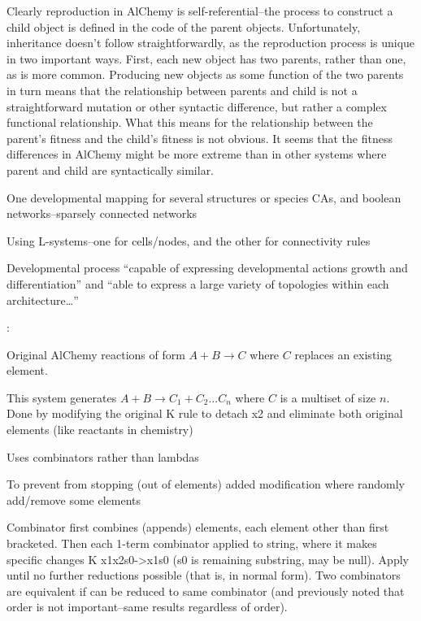 Clearly reproduction in AlChemy is self-referential--the process to construct a child object is defined in the code of the parent objects. Unfortunately, inheritance doesn't follow straightforwardly, as the reproduction process is unique in two important ways. First, each new object has two parents, rather than one, as is more common. Producing new objects as some function of the two parents in turn means that the relationship between parents and child is not a straightforward mutation or other syntactic difference, but rather a complex functional relationship. What this means for the relationship between the parent's fitness and the child's fitness is not obvious. It seems that the fitness differences in AlChemy might be more extreme than in other systems where parent and child are syntactically similar.

\parencite{Antonakopoulos:2011th}

One developmental mapping for several structures or species \eg CAs, and boolean networks--sparsely connected networks

Using L-systems--one for cells/nodes, and the other for connectivity rules

Developmental process ``capable of expressing developmental actions \eg growth and differentiation'' and ``able to express a large variety of topologies within each architecture\ldots{}''


\parencite{Fenizio2000}:

Original AlChemy reactions of form $A+B\rightarrow C$ where $C$ replaces an existing element.

This system generates $A+B\rightarrow C_1+C_2...C_n$ where $C$ is a multiset of size $n$. Done by modifying the original K rule to detach x2 and eliminate both original elements (like reactants in chemistry)

Uses combinators rather than lambdas

To prevent from stopping (out of elements) added modification where randomly add/remove some elements

Combinator first combines (appends) elements, each element other than first bracketed. Then each 1-term combinator applied to string, where it makes specific changes \eg K x1x2s0-\textgreater{}x1s0 (s0 is remaining substring, may be null). Apply until no further reductions possible (that is, in normal form). Two combinators are equivalent if can be reduced to same combinator (and previously noted that order is not important--same results regardless of order).

